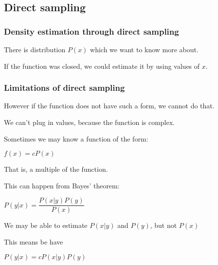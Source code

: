 
\subsection{Direct sampling}

\subsubsection{Density estimation through direct sampling}

There is distribution \(P(x)\) which we want to know more about.

If the function was closed, we could estimate it by using values of \(x\).

\subsubsection{Limitations of direct sampling}

However if the function does not have such a form, we cannot do that.

We can't plug in values, because the function is complex.

Sometimes we may know a function of the form:

\(f(x)=cP(x)\)

That is, a multiple of the function.

This can happen from Bayes' theorem:

\(P(y|x)=\dfrac{P(x|y)P(y)}{P(x)}\)

We may be able to estimate \(P(x|y)\) and \(P(y)\), but not \(P(x)\)

This means be have 

\(P(y|x)=cP(x|y)P(y)\)


